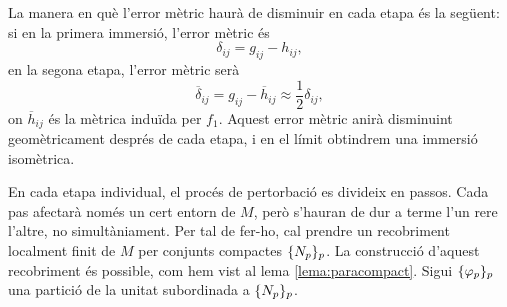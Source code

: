 La manera en què l'error mètric haurà de disminuir en cada etapa és la següent: si en la primera immersió, l'error mètric és 
\begin{equation*}
    \delta_{ij} = g_{ij}-h_{ij},
\end{equation*}
en la segona etapa, l'error mètric serà
\begin{equation*}
    \overline\delta_{ij} = g_{ij}-\overline{h}_{ij}\approx \frac12\delta_{ij},
\end{equation*}
on $\overline{h}_{ij}$ és la mètrica induïda per $f_1$. Aquest error mètric anirà disminuint geomètricament després de cada etapa, i en el límit obtindrem una immersió isomètrica.

En cada etapa individual, el procés de pertorbació es divideix en passos. Cada pas afectarà només un cert entorn de $M$, però s'hauran de dur a terme l'un rere l'altre, no simultàniament. Per tal de fer-ho, cal prendre un recobriment localment finit de $M$ per conjunts compactes $\{N_p\}_p$. La construcció d'aquest recobriment és possible, com hem vist al lema \ref{lema:paracompact}. Sigui $\{\varphi_p\}_p$ una partició de la unitat subordinada a $\{N_p\}_p$. 

